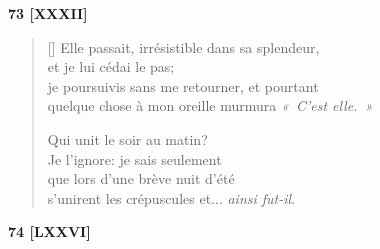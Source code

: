 \documentclass[a4paper,12pt]{book}
\begin{document}
\bigskip

\begin{center}
  \textbf{73 [XXXII]}
\end{center}

\settowidth{\versewidth}{je poursuivis sans me retourner, et pourtant}

\begin{verse}[\versewidth]
  Elle passait, irrésistible dans sa splendeur, \\
  et je lui cédai le pas; \\
  je poursuivis sans me retourner, et pourtant \\
  quelque chose à mon oreille murmura \emph{«~C'est elle.~»}

  Qui unit le soir au matin? \\
  Je l'ignore: je sais seulement \\
  que lors d'une brève nuit d'été \\
  s'unirent les crépuscules et... \emph{ainsi fut-il}.
\end{verse}

\bigskip

\begin{center}
  \textbf{74 [LXXVI]}
\end{center}

\settowidth{\versewidth}{« Oh, quel amour sans paroles que celui de la mort!}
\end{document}
